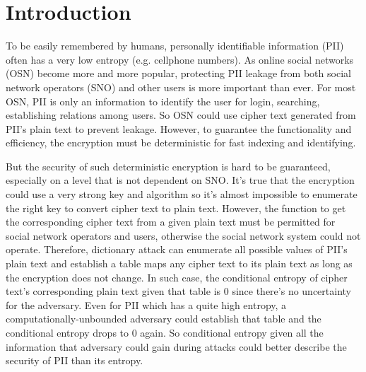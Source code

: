 \documentclass[10pt, conference, compsocconf]{IEEEtran}
\begin{document}
\section{Introduction}
	To be easily remembered by humans, 
	personally identifiable information (PII) often has
	a very low entropy (e.g. cellphone numbers).
	As online social networks (OSN) become more and more popular,
	protecting PII leakage from both social network operators (SNO)
	and other users is more important than ever.
	For most OSN, PII is only an information to identify
	the user for login, searching, establishing relations among
	users. So OSN could use cipher text generated from PII's plain text
	to prevent leakage. However, to guarantee the functionality and efficiency,
	the encryption must be deterministic for fast indexing and identifying.

	
	But the security
	of such deterministic encryption is hard to be guaranteed, especially
	on a level that is not dependent on SNO.
	It's true that the encryption could use a very strong key and algorithm
	so it's almost impossible to enumerate the right key to convert cipher text
	to plain text.
	However, the function to get the corresponding
	cipher text from a given plain text must be permitted for
	social network operators and users, otherwise the social network
	system could not operate.
	Therefore, dictionary attack can enumerate all possible values
	of PII's plain text and establish a table maps any cipher text
	to its plain text as long as the encryption
	does not change. In such case, the conditional entropy \cite{math_book, info_measure} 
	of cipher text's corresponding plain text given that table
	is $0$ since there's no uncertainty for the adversary.
	Even for PII which has a quite high entropy, a
	computationally-unbounded adversary could establish that table
	and the conditional entropy drops to $0$ again. 
	So conditional entropy given
	all the information that adversary could gain during attacks
	could better describe the security of PII than its entropy.
	
\end{document}
